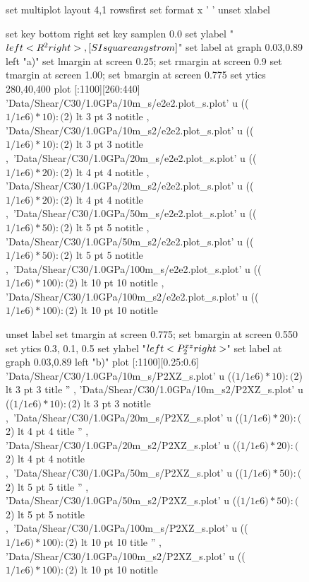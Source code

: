 \documentclass[aps,prb,reprint,superscriptaddress, a4paper]{revtex4-1}
\begin{document}
\begin{figure}
    	\begin{center}
		\begin{gnuplot}[terminal=pdf, terminaloptions={size \SERFigwidth cm, \SERFigheight cm color solid}]
			set multiplot layout 4,1 rowsfirst
			set format x ' '
			unset xlabel

			set key bottom right
			set key samplen  0.0
			set ylabel "$\\left< R^2\\right>  \\,[\\SI{}{\\square\\angstrom}]$"          
			set label at graph 0.03,0.89 left "a)"
			set lmargin at screen 0.25; set rmargin at screen 0.9
			set tmargin at screen 1.00; set bmargin at screen 0.775
			set ytics 280,40,400 
			plot [:1100][260:440] 	'Data/Shear/C30/1.0GPa/10m_s/e2e2.plot_s.plot'  u  (($1/1e6)*10):($2) lt 3 pt 3 notitle  , 'Data/Shear/C30/1.0GPa/10m_s2/e2e2.plot_s.plot'  u (($1/1e6)*10):($2)  lt 3 pt 3 notitle ,\
								'Data/Shear/C30/1.0GPa/20m_s/e2e2.plot_s.plot'  u  (($1/1e6)*20):($2) lt 4 pt 4 notitle  , 'Data/Shear/C30/1.0GPa/20m_s2/e2e2.plot_s.plot'  u (($1/1e6)*20):($2)  lt 4 pt 4 notitle ,\
								'Data/Shear/C30/1.0GPa/50m_s/e2e2.plot_s.plot'   u (($1/1e6)*50):($2) lt 5 pt 5 notitle  , 'Data/Shear/C30/1.0GPa/50m_s2/e2e2.plot_s.plot' u  (($1/1e6)*50):($2)  lt 5 pt 5 notitle ,\
								'Data/Shear/C30/1.0GPa/100m_s/e2e2.plot_s.plot' u  (($1/1e6)*100):($2) lt 10 pt 10 notitle  , 'Data/Shear/C30/1.0GPa/100m_s2/e2e2.plot_s.plot' u (($1/1e6)*100):($2) lt 10 pt 10  notitle 
			
			unset label
			set tmargin at screen 0.775; set bmargin at screen 0.550
			set ytics 0.3, 0.1, 0.5			
			set ylabel "$\\left<P_{2}^{xz}\\right>$"        
			set label at graph 0.03,0.89 left "b)"  
			plot  [:1100][0.25:0.6]	'Data/Shear/C30/1.0GPa/10m_s/P2XZ_s.plot' u   (($1/1e6)*10):($2) lt 3 pt 3 title '' , 'Data/Shear/C30/1.0GPa/10m_s2/P2XZ_s.plot' u   (($1/1e6)*10):($2) lt 3 pt 3 notitle  ,\
								'Data/Shear/C30/1.0GPa/20m_s/P2XZ_s.plot' u   (($1/1e6)*20):($2) lt 4 pt 4 title '' , 'Data/Shear/C30/1.0GPa/20m_s2/P2XZ_s.plot' u   (($1/1e6)*20):($2) lt 4 pt 4 notitle  ,\
								'Data/Shear/C30/1.0GPa/50m_s/P2XZ_s.plot' u  (($1/1e6)*50):($2)  lt 5 pt 5 title '' , 'Data/Shear/C30/1.0GPa/50m_s2/P2XZ_s.plot' u  (($1/1e6)*50):($2)  lt 5 pt 5 notitle ,\
								'Data/Shear/C30/1.0GPa/100m_s/P2XZ_s.plot' u  (($1/1e6)*100):($2) lt 10 pt 10 title '' , 'Data/Shear/C30/1.0GPa/100m_s2/P2XZ_s.plot' u (($1/1e6)*100):($2) lt 10 pt 10 notitle 


\end{gnuplot}
\end{center}
\end{figure}
\end{document}

